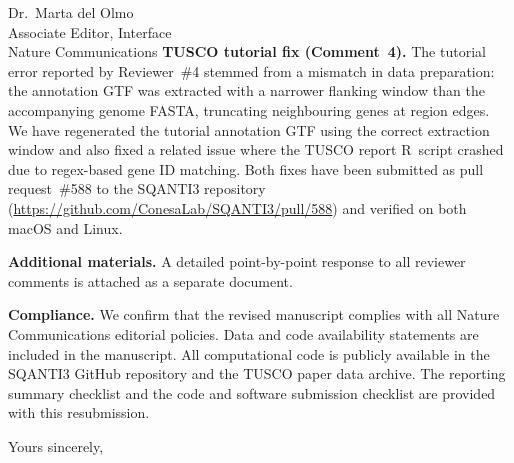 \documentclass[11pt]{letter}
\begin{document}
\begin{letter}{%
Dr.\ Marta del Olmo\\
Associate Editor, Interface\\
Nature Communications}
\bigskip
\textbf{TUSCO tutorial fix (Comment~4).}
The tutorial error reported by Reviewer~\#4 stemmed from a mismatch in
data preparation: the annotation GTF was extracted with a narrower
flanking window than the accompanying genome FASTA, truncating
neighbouring genes at region edges. We have regenerated the tutorial
annotation GTF using the correct extraction window and also fixed a
related issue where the TUSCO report R~script crashed due to regex-based
gene ID matching. Both fixes have been submitted as pull request~\#588 to
the SQANTI3 repository
(\url{https://github.com/ConesaLab/SQANTI3/pull/588}) and verified on
both macOS and Linux.

\bigskip
\textbf{Additional materials.}
A detailed point-by-point response to all reviewer comments is attached
as a separate document.

\bigskip
\textbf{Compliance.}
We confirm that the revised manuscript complies with all Nature
Communications editorial policies. Data and code availability statements
are included in the manuscript. All computational code is publicly
available in the SQANTI3 GitHub repository and the TUSCO paper data
archive. The reporting summary checklist and the code and software
submission checklist are provided with this resubmission.

\closing{Yours sincerely,}

\end{letter}
\end{document}
